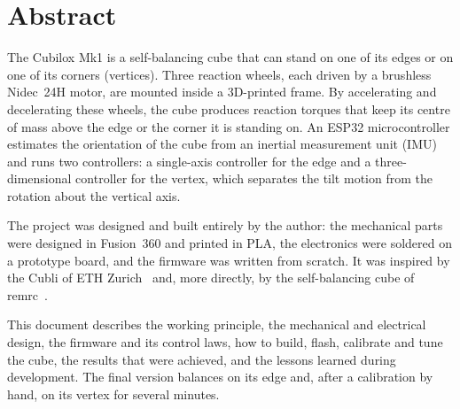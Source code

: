 \chapter*{Abstract}

The Cubilox Mk1 is a self-balancing cube that can stand on one of its edges or on one of its
corners (vertices). Three reaction wheels, each driven by a brushless Nidec~24H motor, are mounted
inside a 3D-printed frame. By accelerating and decelerating these wheels, the cube produces
reaction torques that keep its centre of mass above the edge or the corner it is standing on.
An ESP32 microcontroller estimates the orientation of the cube from an inertial measurement unit
(IMU) and runs two controllers: a single-axis controller for the edge and a three-dimensional
controller for the vertex, which separates the tilt motion from the rotation about the vertical
axis.

The project was designed and built entirely by the author: the mechanical parts were designed in
Fusion~360 and printed in PLA, the electronics were soldered on a prototype board, and the firmware
was written from scratch. It was inspired by the Cubli of ETH Zurich~\cite{gajamohan2012cubli,
gajamohan2013cubli} and, more directly, by the self-balancing cube of remrc~\cite{remrc_cube}.

This document describes the working principle, the mechanical and electrical design, the firmware
and its control laws, how to build, flash, calibrate and tune the cube, the results that were
achieved, and the lessons learned during development. The final version balances on its edge and,
after a calibration by hand, on its vertex for several minutes.
